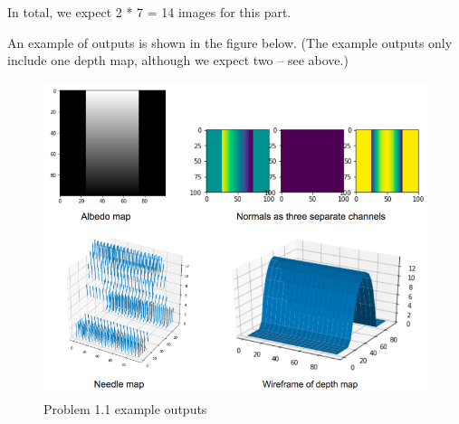 \documentclass[11pt]{article}
\makeatletter
\def\maxwidth{\ifdim\Gin@nat@width>\linewidth\linewidth
    \else\Gin@nat@width\fi}
\let\Oldincludegraphics\includegraphics
\renewcommand{\includegraphics}[1]{\Oldincludegraphics[width=.8\maxwidth]{#1}}
\makeatother
\begin{document}
In total, we expect 2 * 7 = 14 images for this part.

An example of outputs is shown in the figure below. (The example outputs
only include one depth map, although we expect two -- see above.)

\begin{figure}
\centering
\includegraphics{problem1_example.png}
\caption{Problem 1.1 example outputs}
\end{figure}
\end{document}
